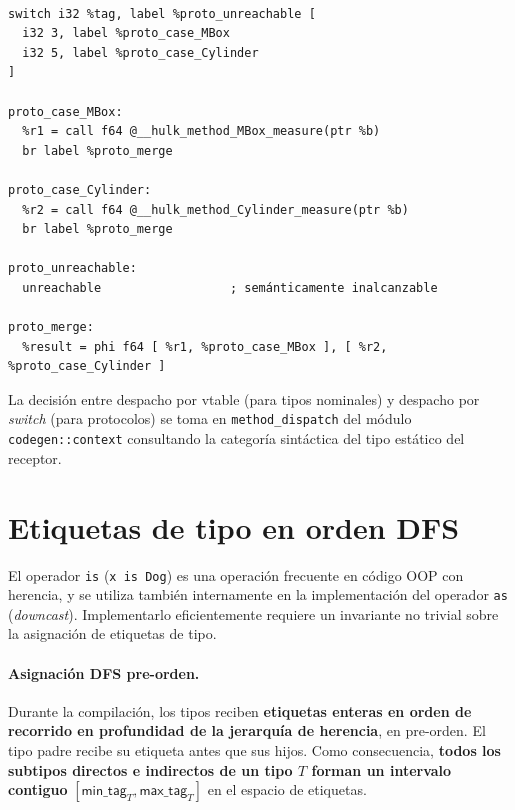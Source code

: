 \documentclass[11pt,a4paper,oneside,openany]{report}
\newcommand{\code}[1]{\texttt{#1}}
\begin{document}
\begin{lstlisting}[style=llvmst,caption={Despacho a través de un protocolo
  \code{Measurable} con dos tipos conformes.}]
%tag = load i32, ptr %b

switch i32 %tag, label %proto_unreachable [
  i32 3, label %proto_case_MBox
  i32 5, label %proto_case_Cylinder
]

proto_case_MBox:
  %r1 = call f64 @__hulk_method_MBox_measure(ptr %b)
  br label %proto_merge

proto_case_Cylinder:
  %r2 = call f64 @__hulk_method_Cylinder_measure(ptr %b)
  br label %proto_merge

proto_unreachable:
  unreachable                  ; semánticamente inalcanzable

proto_merge:
  %result = phi f64 [ %r1, %proto_case_MBox ], [ %r2, %proto_case_Cylinder ]
\end{lstlisting}

La decisión entre despacho por vtable (para tipos nominales) y despacho por
\textit{switch} (para protocolos) se toma en \code{method\_dispatch} del módulo
\code{codegen::context} consultando la categoría sintáctica del tipo estático del
receptor.

\section{Etiquetas de tipo en orden DFS}

El operador \code{is} (\code{x is Dog}) es una operación frecuente en código OOP con
herencia, y se utiliza también internamente en la implementación del operador
\code{as} (\textit{downcast}). Implementarlo eficientemente requiere un invariante
no trivial sobre la asignación de etiquetas de tipo.

\paragraph{Asignación DFS pre-orden.}
Durante la compilación, los tipos reciben \textbf{etiquetas enteras en orden de
recorrido en profundidad de la jerarquía de herencia}, en pre-orden. El tipo padre
recibe su etiqueta antes que sus hijos. Como consecuencia, \textbf{todos los
subtipos directos e indirectos de un tipo $T$ forman un intervalo contiguo}
$[\textsf{min\_tag}_T, \textsf{max\_tag}_T]$ en el espacio de etiquetas.
\end{document}

